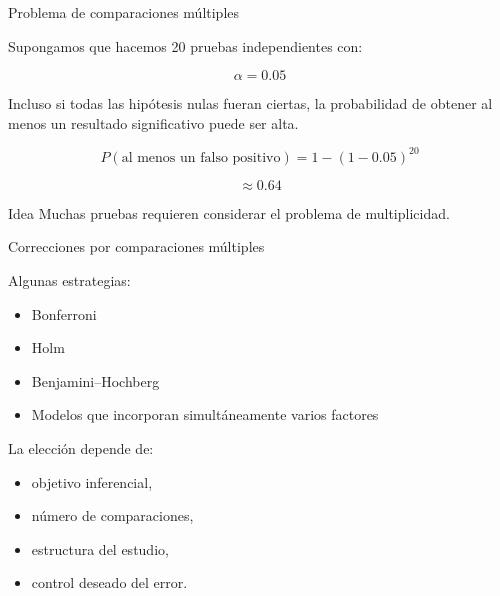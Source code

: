 \begin{frame}{Problema de comparaciones múltiples}

Supongamos que hacemos 20 pruebas independientes con:

\[
\alpha=0.05
\]

Incluso si todas las hipótesis nulas fueran ciertas,
la probabilidad de obtener al menos un resultado significativo puede ser
alta.

\[
P(\text{al menos un falso positivo})
=
1-(1-0.05)^{20}
\]

\[
\approx 0.64
\]

\begin{alertblock}{Idea}
Muchas pruebas requieren considerar el problema de multiplicidad.
\end{alertblock}

\end{frame}

\begin{frame}{Correcciones por comparaciones múltiples}

Algunas estrategias:

\begin{itemize}
    \item Bonferroni
    \item Holm
    \item Benjamini--Hochberg
    \item Modelos que incorporan simultáneamente varios factores
\end{itemize}

La elección depende de:

\begin{itemize}
    \item objetivo inferencial,
    \item número de comparaciones,
    \item estructura del estudio,
    \item control deseado del error.
\end{itemize}

\end{frame}

